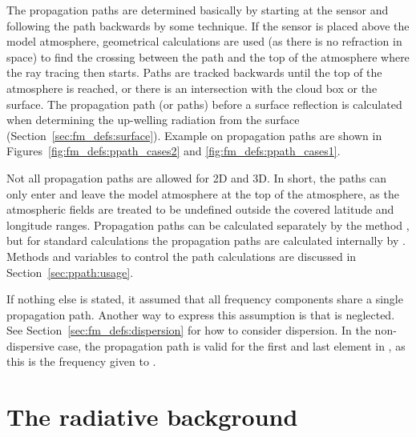 

The propagation paths are determined basically by starting at the
sensor and following the path backwards by some  technique. If the sensor is placed above the model
atmosphere, geometrical calculations are used (as there is no
refraction in space) to find the crossing between the path and the top
of the atmosphere where the ray tracing then starts. Paths are tracked
backwards until the top of the atmosphere is reached, or there is an
intersection with the cloud box or the surface. The propagation path
(or paths) before a surface reflection is calculated when determining
the up-welling radiation from the surface
(Section~\ref{sec:fm_defs:surface}). Example on propagation
paths are shown in Figures~\ref{fig:fm_defs:ppath_cases2} and 
\ref{fig:fm_defs:ppath_cases1}.
 
Not all propagation paths are allowed for 2D and 3D. In short, the paths can
only enter and leave the model atmosphere at the top of the atmosphere, as the
atmospheric fields are treated to be undefined outside the covered latitude and
longitude ranges. Propagation paths can be calculated separately by the method
, but for standard calculations the propagation paths are
calculated internally by . Methods and variables to control
the path calculations are discussed in Section~\ref{sec:ppath:usage}. 

If nothing else is stated, it assumed that all frequency components share a
single propagation path. Another way to express this assumption is that
 is neglected. See Section~\ref{sec:fm_defs:dispersion}
for how to consider dispersion. In the non-dispersive case, the propagation
path is valid for the first and last element in , as this is
the frequency given to .



\section{The radiative background}
\label{sec:fm_defs:rad_bkgr}

